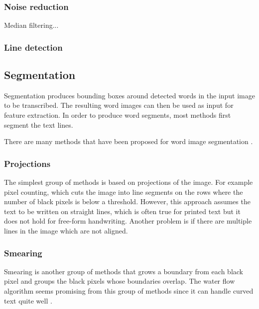 \subsubsection{Noise reduction}


Median filtering...

\subsubsection{Line detection}


\subsection{Segmentation}

Segmentation produces bounding boxes around detected words in the input image to be transcribed. The resulting word images can then be used as input for feature extraction. In order to produce word segments, most methods first segment the text lines.

There are many methods that have been proposed for word image segmentation \cite{HWR_survey, Waterflow2011, Waterflow2015}.

\subsubsection{Projections}

The simplest group of methods is based on projections of the image. For example pixel counting, which cuts the image into line segments on the rows where the number of black pixels is below a threshold. However, this approach assumes the text to be written on straight lines, which is often true for printed text but it does not hold for free-form handwriting. Another problem is if there are multiple lines in the image which are not aligned.

\subsubsection{Smearing}

Smearing is another group of methods that grows a boundary from each black pixel and groups the black pixels whose boundaries overlap. The water flow algorithm seems promising from this group of methods since it can handle curved text quite well \cite{Waterflow2011, Waterflow2015}.

